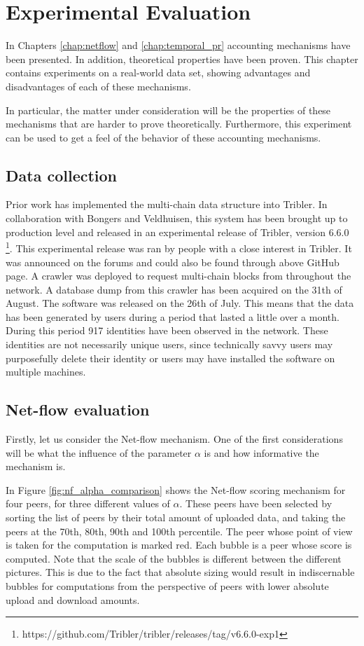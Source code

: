 \documentclass[a4paper,11pt]{book}
\theoremstyle{definition}
\begin{document}
\chapter{Experimental Evaluation}

In Chapters \ref{chap:netflow} and \ref{chap:temporal_pr} accounting mechanisms have been presented.
In addition, theoretical properties have been proven. This chapter contains experiments on a real-world
data set, showing advantages and disadvantages of each of these mechanisms.

In particular, the matter under consideration will be the properties of these mechanisms that are
harder to prove theoretically. Furthermore, this experiment can be used to get a feel of the behavior
of these accounting mechanisms.

\section{Data collection}

Prior work %
has implemented the multi-chain data structure into Tribler. In collaboration with Bongers and Veldhuisen,
this system has been brought up to production level and released in an experimental release of Tribler,
version 6.6.0 \footnote{https://github.com/Tribler/tribler/releases/tag/v6.6.0-exp1}. This experimental
release was ran by people with a close interest in Tribler. It was announced on the forums and could
also be found through above GitHub page. A crawler was deployed to request multi-chain blocks from throughout
the network. A database dump from this crawler has been acquired on the 31th of August. The software
was released on the 26th of July. This means that the data has been generated by users during a period
that lasted a little over a month. During this period 917 identities have been observed in the network.
These identities are not necessarily unique users, since technically savvy users may purposefully 
delete their identity or users may have installed the software on multiple machines.

\section{Net-flow evaluation}

Firstly, let us consider the Net-flow mechanism. One of the first considerations will be what the influence
of the parameter $\alpha$ is and how informative the mechanism is.


In Figure \ref{fig:nf_alpha_comparison} shows the Net-flow scoring mechanism for four peers, for three
different values of $\alpha$. These peers have been selected by sorting the list of peers by their total
amount of uploaded data, and taking the peers at the 70th, 80th, 90th and 100th percentile.
The peer whose point of view is taken for the computation is marked red. Each bubble is a peer whose
score is computed. Note that the scale of the bubbles is different between the different pictures. 
This is due to the fact that absolute sizing would result in indiscernable bubbles for computations
from the perspective of peers with lower absolute upload and download amounts. 
\end{document}
